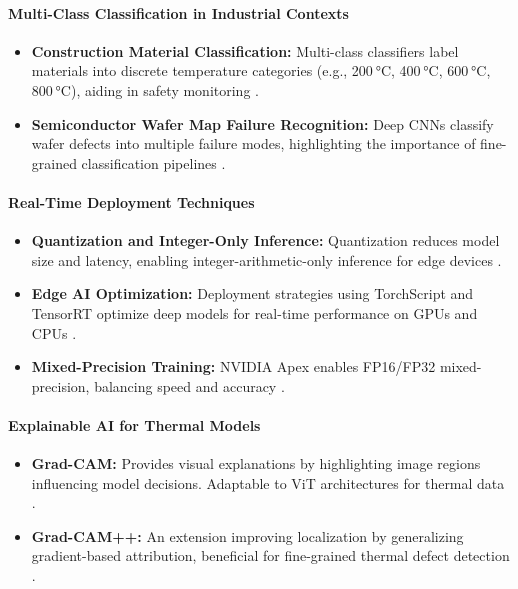 \paragraph{Multi-Class Classification in Industrial Contexts}
\begin{itemize}[leftmargin=*]
    \item \textbf{Construction Material Classification:} Multi-class classifiers label materials into discrete temperature categories (e.g., 200 °C, 400 °C, 600 °C, 800 °C), aiding in safety monitoring \cite{Li2024}.
    \item \textbf{Semiconductor Wafer Map Failure Recognition:} Deep CNNs classify wafer defects into multiple failure modes, highlighting the importance of fine-grained classification pipelines \cite{Zheng2021}.
\end{itemize}

\paragraph{Real-Time Deployment Techniques}
\begin{itemize}[leftmargin=*]
    \item \textbf{Quantization and Integer-Only Inference:} Quantization reduces model size and latency, enabling integer-arithmetic-only inference for edge devices \cite{Jacob2018}.
    \item \textbf{Edge AI Optimization:} Deployment strategies using TorchScript and TensorRT optimize deep models for real-time performance on GPUs and CPUs \cite{Staecker2021}.
    \item \textbf{Mixed-Precision Training:} NVIDIA Apex enables FP16/FP32 mixed-precision, balancing speed and accuracy \cite{Staecker2021}.
\end{itemize}

\paragraph{Explainable AI for Thermal Models}
\begin{itemize}[leftmargin=*]
    \item \textbf{Grad-CAM:} Provides visual explanations by highlighting image regions influencing model decisions. Adaptable to ViT architectures for thermal data \cite{Selvaraju2020}.
    \item \textbf{Grad-CAM++:} An extension improving localization by generalizing gradient-based attribution, beneficial for fine-grained thermal defect detection \cite{Chattopadhyay2018}.
\end{itemize}

